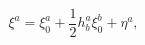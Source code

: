 \begin{equation}
\xi ^{a}=\xi _{0}^{a}+\frac{1}{2}h_{b}^{a}\xi _{0}^{b}+\eta ^{a},  \label{57}
\end{equation}

